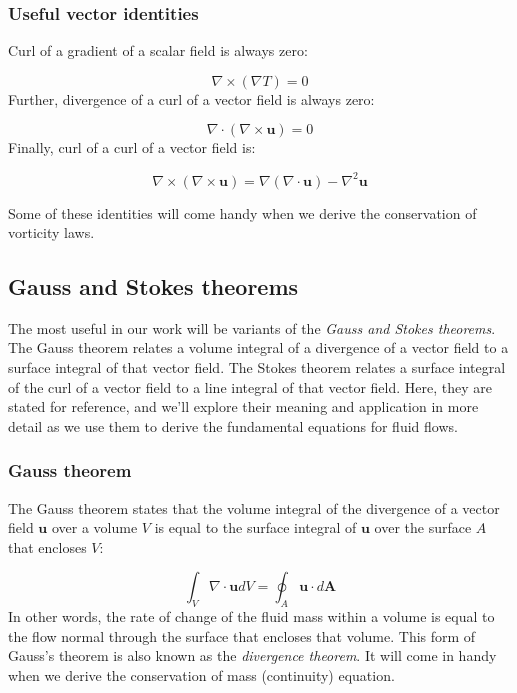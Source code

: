 \documentclass[12pt]{article}
\numberwithin{equation}{section}
\numberwithin{figure}{section}
\numberwithin{table}{section}
\begin{document}
\subsubsection{Useful vector identities}

Curl of a gradient of a scalar field is always zero:

\begin{equation}
  \nabla \times (\nabla T) = 0
\end{equation}
Further, divergence of a curl of a vector field is always zero:

\begin{equation}
  \nabla \cdot (\nabla \times \mathbf{u}) = 0
\end{equation}
Finally, curl of a curl of a vector field is:

\begin{equation}
  \nabla \times (\nabla \times \mathbf{u}) = \nabla (\nabla \cdot \mathbf{u}) - \nabla^2 \mathbf{u}
\end{equation}

Some of these identities will come handy when we derive the conservation of
vorticity laws.

\subsection{Gauss and Stokes theorems}

The most useful in our work will be variants of the
\textit{Gauss and Stokes theorems}.
The Gauss theorem relates a volume integral of a divergence of a vector field
to a surface integral of that vector field.
The Stokes theorem relates a surface integral of the curl of a vector field to
a line integral of that vector field.
Here, they are stated for reference, and we'll explore their meaning and
application in more detail as we use them to derive the fundamental equations
for fluid flows.

\subsubsection{Gauss theorem}

The Gauss theorem states that the volume integral of the
divergence of a vector field $\mathbf{u}$ over a volume $V$ is equal to the
surface integral of $\mathbf{u}$ over the surface $A$ that encloses $V$:

\begin{equation}
  \label{eq:divergence_theorem}
  \int_V \nabla \cdot \mathbf{u} dV = \oint_A \mathbf{u} \cdot d\mathbf{A}
\end{equation}
In other words, the rate of change of the fluid mass within a volume is equal to
the flow normal through the surface that encloses that volume.
This form of Gauss's theorem is also known as the
\textit{divergence theorem}.
It will come in handy when we derive the conservation of mass (continuity)
equation.
\end{document}
